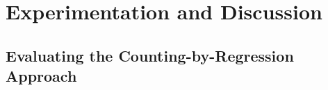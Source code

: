 






\def\baselinestretch{1}

\chapter{Experimentation and Discussion}



\smallskip

\goodbreak

\section{Evaluating the Counting-by-Regression Approach}
